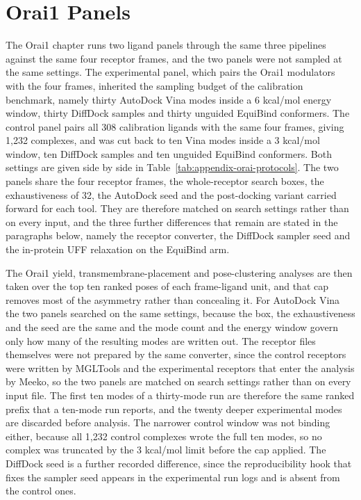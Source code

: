 \hypertarget{orai1-panels}{%
\section{Orai1 Panels}\label{orai1-panels}}

The Orai1 chapter runs two ligand panels through the same three pipelines against the same four receptor frames, and the two panels were not sampled at the same settings. The experimental panel, which pairs the Orai1 modulators with the four frames, inherited the sampling budget of the calibration benchmark, namely thirty AutoDock Vina modes inside a 6 kcal/mol energy window, thirty DiffDock samples and thirty unguided EquiBind conformers. The control panel pairs all 308 calibration ligands with the same four frames, giving 1,232 complexes, and was cut back to ten Vina modes inside a 3 kcal/mol window, ten DiffDock samples and ten unguided EquiBind conformers. Both settings are given side by side in Table~\ref{tab:appendix-orai-protocols}. The two panels share the four receptor frames, the whole-receptor search boxes, the exhaustiveness of 32, the AutoDock seed and the post-docking variant carried forward for each tool. They are therefore matched on search settings rather than on every input, and the three further differences that remain are stated in the paragraphs below, namely the receptor converter, the DiffDock sampler seed and the in-protein UFF relaxation on the EquiBind arm.

The Orai1 yield, transmembrane-placement and pose-clustering analyses are then taken over the top ten ranked poses of each frame-ligand unit, and that cap removes most of the asymmetry rather than concealing it. For AutoDock Vina the two panels searched on the same settings, because the box, the exhaustiveness and the seed are the same and the mode count and the energy window govern only how many of the resulting modes are written out. The receptor files themselves were not prepared by the same converter, since the control receptors were written by MGLTools and the experimental receptors that enter the analysis by Meeko, so the two panels are matched on search settings rather than on every input file. The first ten modes of a thirty-mode run are therefore the same ranked prefix that a ten-mode run reports, and the twenty deeper experimental modes are discarded before analysis. The narrower control window was not binding either, because all 1,232 control complexes wrote the full ten modes, so no complex was truncated by the 3 kcal/mol limit before the cap applied. The DiffDock seed is a further recorded difference, since the reproducibility hook that fixes the sampler seed appears in the experimental run logs and is absent from the control ones.

